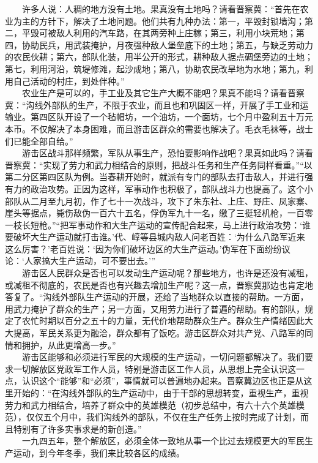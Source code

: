 \documentclass[cn,11pt,chinese]{elegantbook}
\begin{document}
　　许多人说：人稠的地方没有土地。果真没有土地吗？请看晋察冀：“首先在农业为主的方针下，解决了土地问题。他们共有九种办法：第一，平毁封锁墙沟；第二，平毁可被敌人利用的汽车路，在其两旁种上庄稼；第三，利用小块荒地；第四，协助民兵，用武装掩护，月夜强种敌人堡垒底下的土地；第五，与缺乏劳动力的农民伙耕；第六，部队化装，用半公开的形式，耕种敌人据点碉堡旁边的土地；第七，利用河沿，筑堤修滩，起沙成地；第八，协助农民改旱地为水地；第九，利用自己活动的村庄，到处伴种。”\\
　　农业生产是可以的，手工业及其它生产大概不能吧？果真不能吗？请看晋察冀：“沟线外部队的生产，不限于农业，而且也和巩固区一样，开展了手工业和运输业。第四区队开设了一个毡帽坊，一个油坊，一个面坊，七个月中盈利五十万元本币。不仅解决了本身困难，而且游击区群众的需要也解决了。毛衣毛袜等，战士们已能全部自给。”\\
　　游击区战斗那样频繁，军队从事生产，恐怕要影响作战吧？果真如此吗？请看晋察冀：“实现了劳力和武力相结合的原则，把战斗任务和生产任务同样看重。”“以第二分区第四区队为例。当春耕开始时，就派有专门的部队去打击敌人，并进行强有力的政治攻势。正因为这样，军事动作也积极了，部队战斗力也提高了。这个小部队从二月至九月初，作了七十一次战斗，攻下了朱东社、上庄、野庄、凤家寨、崖头等据点，毙伤敌伪一百六十五名，俘伪军九十一名，缴了三挺轻机枪，一百零一枝长短枪。”“把军事动作和大生产运动的宣传配合起来，马上进行政治攻势：‘谁要破坏大生产运动就打击谁。’代、崞等县城内敌人问老百姓：‘为什么八路军近来这么厉害？’老百姓说：‘因为你们破坏边区的大生产运动。’伪军在下面纷纷议论：‘人家搞大生产运动，可不要出去。’”\\
　　游击区人民群众是否也可以发动生产运动呢？那些地方，也许是还没有减租，或减租不彻底的，农民是否也有兴趣去增加生产呢？这一点，晋察冀那边也肯定地答复了。“沟线外部队生产运动的开展，还给了当地群众以直接的帮助。一方面，用武力掩护了群众的生产；另一方面，又用劳力进行了普遍的帮助。有的部队，规定了农忙时期以百分之五十的力量，无代价地帮助群众生产。群众生产情绪因此大大提高，军民关系更为融洽，群众都有了饭吃。游击区群众对共产党、八路军的同情和拥护，从此更增高一步。”\\
　　游击区能够和必须进行军民的大规模的生产运动，一切问题都解决了。我们要求一切解放区党政军工作人员，特别是游击区工作人员，从思想上完全认识这一点，认识这个“能够”和“必须”，事情就可以普遍地办起来。晋察冀边区也正是从这里开始的：“在沟线外部队的生产运动中，由于干部的思想转变，重视生产，重视劳力和武力相结合，培养了群众中的英雄模范（初步总结中，有六十六个英雄模范），仅仅五个月中，我们沟线外的部队，不仅在生产任务上按时完成了计划，而且特别有了许多实事求是的新创造。”\\
　　一九四五年，整个解放区，必须全体一致地从事一个比过去规模更大的军民生产运动，到今年冬季，我们来比较各区的成绩。\\
\end{document}
